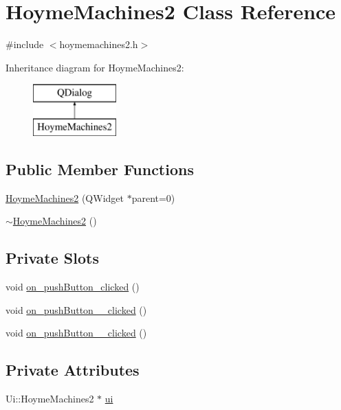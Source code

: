 \hypertarget{classHoymeMachines2}{}\section{Hoyme\+Machines2 Class Reference}
\label{classHoymeMachines2}


{\ttfamily \#include $<$hoymemachines2.\+h$>$}

Inheritance diagram for Hoyme\+Machines2\+:\begin{figure}[H]
\begin{center}
\leavevmode
\includegraphics[height=2.000000cm]{classHoymeMachines2}
\end{center}
\end{figure}
\subsection*{Public Member Functions}
\begin{DoxyCompactItemize}
\item 
\hyperlink{classHoymeMachines2_a32862a1bf56faae9c5f2e19b35c9aa79}{Hoyme\+Machines2} (Q\+Widget $\ast$parent=0)
\item 
\hyperlink{classHoymeMachines2_a2bf57e034cd78d797fdf2927b3c0c196}{$\sim$\+Hoyme\+Machines2} ()
\end{DoxyCompactItemize}
\subsection*{Private Slots}
\begin{DoxyCompactItemize}
\item 
void \hyperlink{classHoymeMachines2_a55756f369dc90523143981d695992d74}{on\+\_\+push\+Button\+\_\+clicked} ()
\item 
void \hyperlink{classHoymeMachines2_a37269b3dacf0da0cf74e63e656cc0913}{on\+\_\+push\+Button\+\_\+\_\+clicked} ()
\item 
void \hyperlink{classHoymeMachines2_af571e9f353807491b2077b8927c3d441}{on\+\_\+push\+Button\+\_\+\_\+clicked} ()
\end{DoxyCompactItemize}
\subsection*{Private Attributes}
\begin{DoxyCompactItemize}
\item 
Ui\+::\+Hoyme\+Machines2 $\ast$ \hyperlink{classHoymeMachines2_a23ed6d02b1c5761599fa024214a66d11}{ui}
\end{DoxyCompactItemize}



